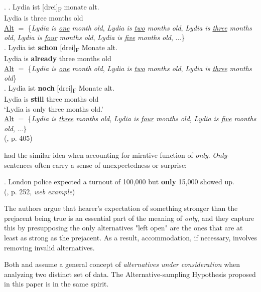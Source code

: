 \documentclass[12pt,letterpaper]{scrartcl}
\newcommand{\alignright}{\hspace*{\fill}}
\newcommand{\sub}[1]{\textsubscript{#1}}
\begin{document}
\ex. \ag. Lydia ist [drei]\sub{F} monate alt. \\
Lydia is three months old \\
\underline{Alt} $=$ \{\textit{Lydia is \underline{one} month old}, \textit{Lydia is \underline{two} months old}, \textit{Lydia is \underline{three} months old}, \textit{Lydia is \underline{four} months old}, \textit{Lydia is \underline{five} months old}, ...\}\\
\bg. Lydia ist \textbf{schon} [drei]\sub{F} Monate alt. \\
Lydia is \textbf{already} three months old  \\
\underline{Alt} $=$ \{\textit{Lydia is \underline{one} month old}, \textit{Lydia is \underline{two} months old}, \textit{Lydia is \underline{three} months old}\} \\
\bg. Lydia ist \textbf{noch} [drei]\sub{F} Monate alt. \\
Lydia is \textbf{still} three months old \\
`Lydia is only three months old.' \\
\underline{Alt} $=$ \{\textit{Lydia is \underline{three} months old}, \textit{Lydia is \underline{four} months old}, \textit{Lydia is \underline{five} months old}, ...\} \\
\alignright (\cite{krifka_alternatives_2000}, p. 405)

\cite{beaver_sense_2008} had the similar idea when accounting for mirative function of \textit{only}. \textit{Only}-sentences often carry a sense of unexpectedness or surprise:

\ex. London police expected a turnout of 100,000 but \textbf{only} 15,000 showed up. \\ \alignright (\cite{beaver_sense_2008}, p. 252, \textit{web example})

The authors argue that hearer's expectation of something stronger than the prejacent being true is an essential part of the meaning of \textit{only}, and they capture this by presupposing the only alternatives "left open" are the ones that are at least as strong as the prejacent. As a result, accommodation, if necessary, involves removing invalid alternatives. 

Both \cite{krifka_alternatives_2000} and \cite{beaver_sense_2008} assume a general concept of \textit{alternatives under consideration} when analyzing two distinct set of data. The Alternative-sampling Hypothesis proposed in this paper is in the same spirit.

\end{document}
